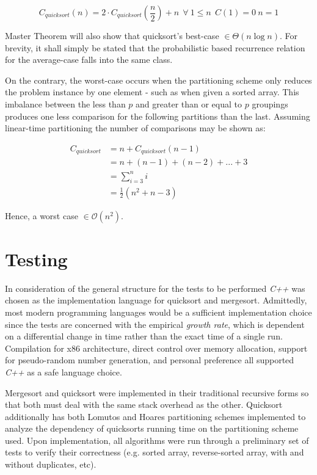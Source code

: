 \documentclass[11pt,letterpaper]{report}
\begin{document}
\begin{equation} 
C_{quicksort}(n)=2 \cdot C_{quicksort}(\frac{n}{2})+n \ \ \forall \ 1 \leq n \ \ C(1) = 0 \ n=1
\end{equation}

Master Theorem will also show that quicksort's best-case $\in \Theta(n\log{}n)$. For brevity, it shall simply be stated that the probabilistic based recurrence relation for the average-case falls into the same class.

On the contrary, the worst-case occurs when the partitioning scheme only reduces the problem instance by one element - such as when given a sorted array. This imbalance between the less than $p$ and greater than or equal to $p$ groupings produces one less comparison for the following partitions than the last. Assuming linear-time partitioning the number of comparisons may be shown as:

\begin{equation} \label{eq1}
\begin{split}
C_{quicksort} & =n+C_{quicksort}(n-1) \\
		     & =n+(n-1)+(n-2)+...+3 \\
                      & = \sum_{i=3}^{n}i \\
                      & = \frac{1}{2}(n^2+n-3)
\end{split}
\end{equation}


Hence, a worst case $\in \mathcal{O}(n^2)$.

\section*{Testing}
In consideration of the general structure for the tests to be performed \emph{C++} was chosen as the implementation language for quicksort and mergesort. Admittedly, most modern programming languages would be a sufficient implementation choice since the tests are concerned with the empirical \emph{growth rate}, which is dependent on a differential change in time rather than the exact time of a single run. Compilation for x86 architecture, direct control over memory allocation, support for pseudo-random number generation, and personal preference all supported \emph{C++} as a safe language choice.

Mergesort and quicksort were implemented in their traditional recursive forms so that both must deal with the same stack overhead as the other. Quicksort additionally has both Lomutos and Hoares partitioning schemes implemented to analyze the dependency of quicksorts running time on the partitioning scheme used. Upon implementation, all algorithms were run through a preliminary set of tests to verify their correctness (e.g. sorted array, reverse-sorted array, with and without duplicates, etc).
\end{document}
